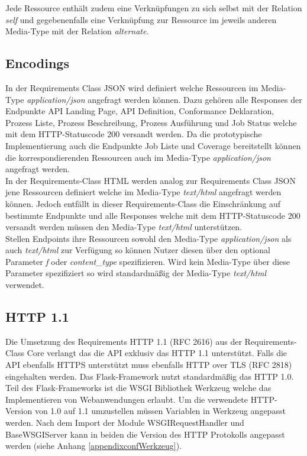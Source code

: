 Jede Ressource enthält zudem eine Verknüpfungen zu sich selbst mit der Relation \textit{self} und gegebenenfalls eine Verknüpfung 
zur Ressource im jeweils anderen Media-Type mit der Relation \textit{alternate}. 

\subsection{Encodings}
In der Requirements Class JSON wird definiert welche Ressourcen im Media-Type \textit{application/json} angefragt werden können. Dazu gehören alle Responses der 
Endpunkte API Landing Page, API Definition, Conformance Deklaration, Prozess Liste, Prozess Beschreibung, Prozess Ausführung und Job Status welche mit dem 
HTTP-Statuscode 200 versandt werden. Da die prototypische Implementierung auch die Endpunkte Job Liste und Coverage bereitstellt können die korrespondierenden
Ressourcen auch im Media-Type \textit{application/json} angefragt werden.\\

In der Requirements-Class HTML werden analog zur Requirements Class JSON jene Ressourcen definiert welche im Media-Type \textit{text/html} angefragt werden können. Jedoch
entfällt in dieser Requirements-Class die Einschränkung auf bestimmte Endpunkte und alle Responses welche mit dem HTTP-Statuscode 200 versandt werden müssen den 
Media-Type \textit{text/html} unterstützen.\\
Stellen Endpoints ihre Ressourcen sowohl den Media-Type \textit{application/json} als auch \textit{text/html} zur Verfügung so können Nutzer diesen über den optional Parameter
\textit{f} oder \textit{content\_type} spezifizieren. Wird kein Media-Type über diese Parameter spezifiziert so wird standardmäßig der Media-Type \textit{text/html} verwendet. \\

\subsection{HTTP 1.1}
Die Umsetzung des Requirements HTTP 1.1 (RFC 2616) aus der Requirements-Class Core verlangt das die API exklusiv das HTTP 1.1 unterstützt. 
Falls die API ebenfalls HTTPS unterstützt muss ebenfalls HTTP over TLS (RFC 2818) eingehalten werden. 
Das Flask-Framework nutzt standardmäßig das HTTP 1.0. Teil des Flask-Frameworks ist die WSGI Bibliothek Werkzeug welche
das Implementieren von Webanwendungen erlaubt. Um die verwendete HTTP-Version von 1.0 auf 1.1 umzustellen müssen Variablen 
in Werkzeug angepasst werden. Nach dem Import der Module WSGIRequestHandler und BaseWSGIServer kann in beiden die 
Version des HTTP Protokolls angepasst werden (siehe Anhang \ref{appendixconfWerkzeug}). 

